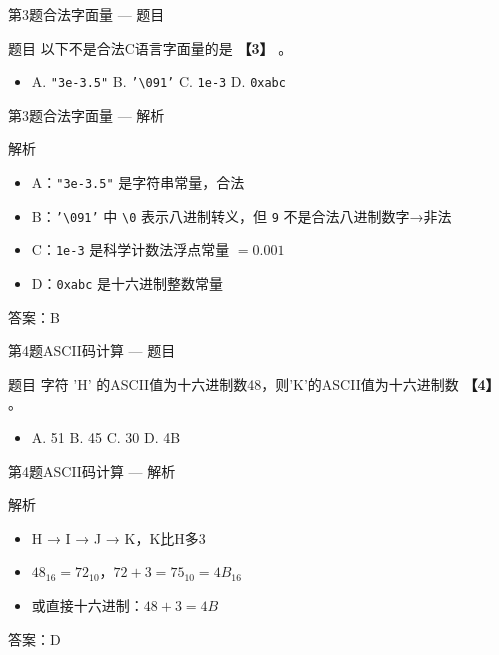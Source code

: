 \begin{frame}{第3题}{合法字面量 --- 题目}
    \begin{exampleblock}{题目}
        \small 以下不是合法C语言字面量的是 \textbf{【3】} 。
        \begin{itemize}
            \item A. \texttt{"3e-3.5"} \quad B. \texttt{'\textbackslash 091'} \quad C. \texttt{1e-3} \quad D. \texttt{0xabc}
        \end{itemize}
    \end{exampleblock}
\end{frame}

\begin{frame}{第3题}{合法字面量 --- 解析}
    \begin{alertblock}{解析}
        \footnotesize
        \begin{itemize}
            \item A：\texttt{"3e-3.5"} 是字符串常量，合法
            \item B：\texttt{'\textbackslash 091'} 中 \texttt{\textbackslash 0} 表示八进制转义，但 \texttt{9} 不是合法八进制数字→非法
            \item C：\texttt{1e-3} 是科学计数法浮点常量 $=0.001$
            \item D：\texttt{0xabc} 是十六进制整数常量
        \end{itemize}
        {\color{highlight}答案：B}
    \end{alertblock}
\end{frame}

\begin{frame}{第4题}{ASCII码计算 --- 题目}
    \begin{exampleblock}{题目}
        字符 'H' 的ASCII值为十六进制数48，则'K'的ASCII值为十六进制数 \textbf{【4】} 。
        \begin{itemize}
            \item A. 51 \quad B. 45 \quad C. 30 \quad D. 4B
        \end{itemize}
    \end{exampleblock}
\end{frame}

\begin{frame}{第4题}{ASCII码计算 --- 解析}
    \begin{alertblock}{解析}
        \begin{itemize}
            \item H → I → J → K，K比H多3
            \item $48_{16} = 72_{10}$，$72+3=75_{10}=4B_{16}$
            \item 或直接十六进制：$48+3=4B$
        \end{itemize}
        {\color{highlight}答案：D}
    \end{alertblock}
\end{frame}

